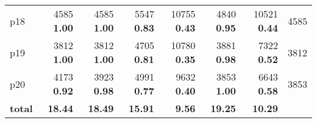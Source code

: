 \begin{tabular}{lrrrrrrr}
\multicolumn{1}{l|}{p18} & {\footnotesize 4585} \textbf{1.00} & {\footnotesize 4585} \textbf{1.00} & {\footnotesize 5547} \textbf{0.83} & {\footnotesize 10755} \textbf{0.43} & {\footnotesize 4840} \textbf{0.95} & {\footnotesize 10521} \textbf{0.44} & \multicolumn{1}{|r}{4585}\\
\multicolumn{1}{l|}{p19} & {\footnotesize 3812} \textbf{1.00} & {\footnotesize 3812} \textbf{1.00} & {\footnotesize 4705} \textbf{0.81} & {\footnotesize 10780} \textbf{0.35} & {\footnotesize 3881} \textbf{0.98} & {\footnotesize 7322} \textbf{0.52} & \multicolumn{1}{|r}{3812}\\
\multicolumn{1}{l|}{p20} & {\footnotesize 4173} \textbf{0.92} & {\footnotesize 3923} \textbf{0.98} & {\footnotesize 4991} \textbf{0.77} & {\footnotesize 9632} \textbf{0.40} & {\footnotesize 3853} \textbf{1.00} & {\footnotesize 6643} \textbf{0.58} & \multicolumn{1}{|r}{3853}\\
\midrule
\textbf{total} & \textbf{18.44} & \textbf{18.49} & \textbf{15.91} & \textbf{9.56} & \textbf{19.25} & \textbf{10.29} & \\
\bottomrule
\end{tabular}


